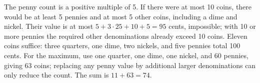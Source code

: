 The penny count is a positive multiple of 5. If there were at most 10 coins, there would be at least 5 pennies and at most 5 other coins, including a dime and nickel. Their value is at most $5+3\cdot25+10+5=95$ cents, impossible; with 10 or more pennies the required other denominations already exceed 10 coins. Eleven coins suffice: three quarters, one dime, two nickels, and five pennies total 100 cents. For the maximum, use one quarter, one dime, one nickel, and 60 pennies, giving 63 coins; replacing any penny value by additional larger denominations can only reduce the count. The sum is $11+63=\boxed{74}$.
